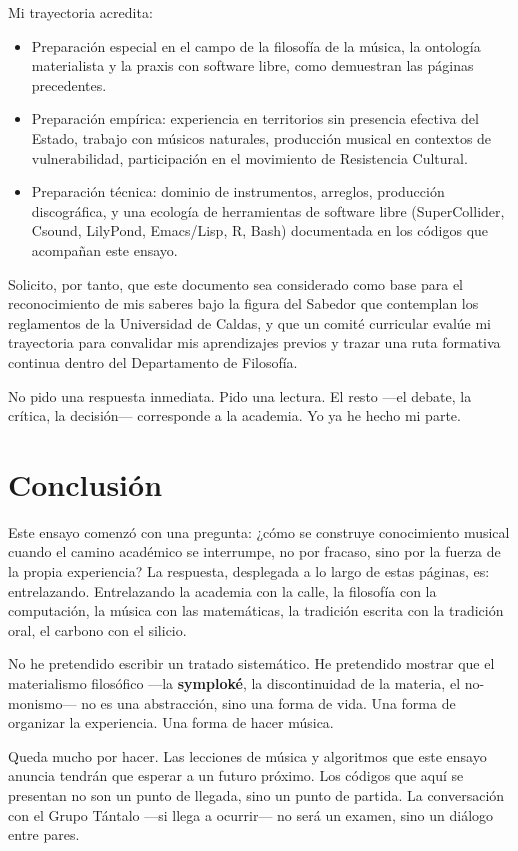 \documentclass[14pt, a4paper]{article}
\begin{document}
Mi trayectoria acredita:

\begin{itemize}
\item Preparación especial en el campo de la filosofía de la música,
la ontología materialista y la praxis con software libre, como
demuestran las páginas precedentes.
\item Preparación empírica: experiencia en territorios sin presencia
efectiva del Estado, trabajo con músicos naturales, producción
musical en contextos de vulnerabilidad, participación en el
movimiento de Resistencia Cultural.
\item Preparación técnica: dominio de instrumentos, arreglos, producción
discográfica, y una ecología de herramientas de software libre
(SuperCollider, Csound, LilyPond, Emacs/Lisp, R, Bash) documentada
en los códigos que acompañan este ensayo.
\end{itemize}

Solicito, por tanto, que este documento sea considerado como base para
el reconocimiento de mis saberes bajo la figura del Sabedor que
contemplan los reglamentos de la Universidad de Caldas, y que un
comité curricular evalúe mi trayectoria para convalidar mis
aprendizajes previos y trazar una ruta formativa continua dentro del
Departamento de Filosofía.

No pido una respuesta inmediata. Pido una lectura. El resto —el
debate, la crítica, la decisión— corresponde a la academia. Yo ya he
hecho mi parte.
\section{Conclusión}
\label{conclusion}
Este ensayo comenzó con una pregunta: ¿cómo se construye conocimiento
musical cuando el camino académico se interrumpe, no por fracaso, sino
por la fuerza de la propia experiencia? La respuesta, desplegada a lo
largo de estas páginas, es: entrelazando. Entrelazando la academia con
la calle, la filosofía con la computación, la música con las
matemáticas, la tradición escrita con la tradición oral, el carbono
con el silicio.

No he pretendido escribir un tratado sistemático. He pretendido
mostrar que el materialismo filosófico —la \textbf{symploké}, la
discontinuidad de la materia, el no-monismo— no es una abstracción,
sino una forma de vida. Una forma de organizar la experiencia. Una
forma de hacer música.

Queda mucho por hacer. Las lecciones de música y algoritmos que este
ensayo anuncia tendrán que esperar a un futuro próximo. Los códigos
que aquí se presentan no son un punto de llegada, sino un punto de
partida. La conversación con el Grupo Tántalo —si llega a ocurrir— no
será un examen, sino un diálogo entre pares.
\end{document}
